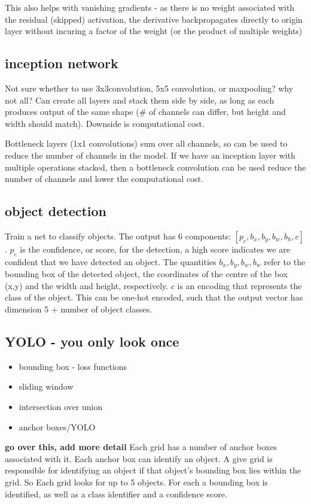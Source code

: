 \documentclass{article}
\begin{document}
This also helps with vanishing gradients - as there is no weight associated with the residual (skipped) activation, the derivative backpropagates directly to origin layer without incuring a factor of the weight (or the product of multiple weights)

\subsection{inception network}
Not sure whether to use 3x3convolution, 5x5 convolution, or maxpooling? why not all? Can create all layers and stack them side by side, as long as each produces output of the same shape (# of channels can differ, but height and width should match).
Downside is computational cost.

Bottleneck layers (1x1 convolutions) sum over all channels, so can be used to reduce the number of channels in the model. If we have an inception layer with multiple operations stacked, then a bottleneck convolution can be used reduce the number of channels and lower the computational cost.

\subsection{object detection}
Train a net to classify objects. The output has 6 components: $[p_c, b_x, b_y, b_w, b_h, c]$. $p_c$ is the confidence, or score, for the detection, a high score indicates we are confident that we have detected an object. The quantities $b_x, b_y, b_w, b_w$ refer to the bounding box of the detected object, the coordinates of the centre of the box (x,y) and the width and height, respectively. $c$ is an encoding that represents the class of the object. This can be one-hot encoded, such that the output vector has dimension 5 + number of object classes.



\subsection{YOLO - you only look once}
\begin{itemize}
	\item bounding box - loss functions
	\item sliding window
	\item intersection over union
	\item anchor boxes/YOLO
\end{itemize}
{\bf go over this, add more detail}
Each grid has a number of anchor boxes associated with it. Each anchor box can identify an object. A give grid is responsible for identifying an object if that object's bounding box lies within the grid.
So Each grid looks for up to 5 objects. For each a bounding box is identified, as well as a class identifier and a confidence score. 
\end{document}
